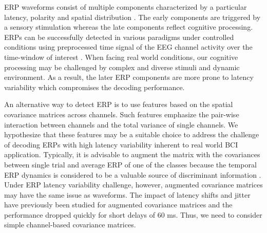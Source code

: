 \documentclass[12pt]{iopart}
\begin{document}

ERP waveforms consist of multiple components characterized
by a particular latency, polarity and spatial distribution \cite{duncan_event-related_2009}.
The early components are triggered by a sensory stimulation
whereas the late components reflect cognitive processing.
ERPs can be successfully detected in various paradigms under controlled conditions
using preprocessed time signal of the EEG channel activity over the time-window of interest \cite{blankertz_single-trial_2011}.
When facing real world conditions, our cognitive processing may be challenged
by complex and diverse stimuli and dynamic environment.
As a result, the later ERP components are more prone to latency variability \cite{arico_evaluation_2013}
which compromises the decoding performance.


An alternative way to detect ERP is to use features based on the spatial covariance matrices across channels. Such
features emphasize the pair-wise interaction
between channels and the total variance of single channels.
We hypothesize that these features may be a suitable choice
to address the challenge of decoding ERPs with high latency variability 
inherent to real world BCI application.
Typically, it is advisable to augment the matrix
with the covariances between single trial and average ERP
of one of the classes because the temporal ERP dynamics is considered to be
a valuable source of discriminant information \cite{congedo_new_2013,barachant_plug&play_2014}.
Under ERP latency variability challenge, however, 
augmented covariance matrices may have the same issue as
waveforms.
The impact of latency shifts and jitter have previously been studied
for augmented covariance matrices \cite{barachant_plug&play_2014}
and the performance dropped quickly for short delays of 60 ms.
Thus, we need to consider simple channel-based covariance matrices.
\end{document}
